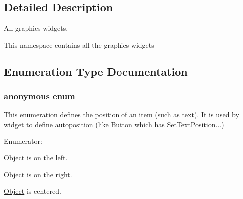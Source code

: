 \subsection{Detailed Description}
All graphics widgets. 

This namespace contains all the graphics widgets 

\subsection{Enumeration Type Documentation}
\hypertarget{namespacesfgui_ed969f0aaa542b462035e828757f4313}{
\subsubsection["@0]{\setlength{\rightskip}{0pt plus 5cm}anonymous enum}}
\label{namespacesfgui_ed969f0aaa542b462035e828757f4313}


This enumeration defines the position of an item (such as text). It is used by widget to define autoposition (like \hyperlink{classsfgui_1_1Button}{Button} which has SetTextPosition...) \begin{Desc}
\item[Enumerator: ]\par
\begin{description}
\item[{\em 
\hypertarget{namespacesfgui_ed969f0aaa542b462035e828757f431328ce9405120beac8fae51bc232aeabec}{
Left}
\label{namespacesfgui_ed969f0aaa542b462035e828757f431328ce9405120beac8fae51bc232aeabec}
}]\hyperlink{classsfgui_1_1Object}{Object} is on the left. \item[{\em 
\hypertarget{namespacesfgui_ed969f0aaa542b462035e828757f4313d4fbbcf5a5a40412eeb0175f82c85b3f}{
Right}
\label{namespacesfgui_ed969f0aaa542b462035e828757f4313d4fbbcf5a5a40412eeb0175f82c85b3f}
}]\hyperlink{classsfgui_1_1Object}{Object} is on the right. \item[{\em 
\hypertarget{namespacesfgui_ed969f0aaa542b462035e828757f43130172869b534ad2378e28e388342699cc}{
Center}
\label{namespacesfgui_ed969f0aaa542b462035e828757f43130172869b534ad2378e28e388342699cc}
}]\hyperlink{classsfgui_1_1Object}{Object} is centered. \end{description}
\end{Desc}

